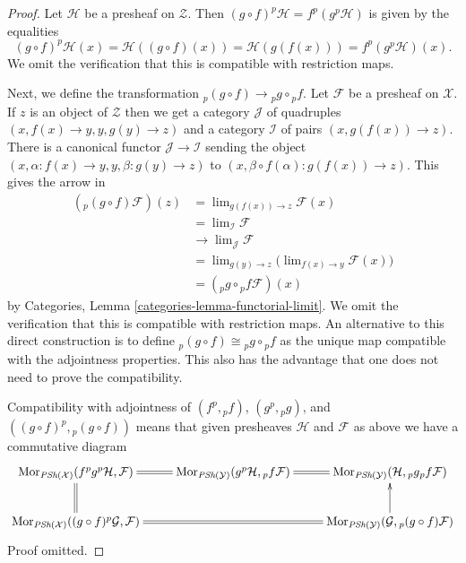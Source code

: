 \documentclass[10pt,a4paper]{amsart}
\theoremstyle{plain}
\theoremstyle{definition}
\theoremstyle{remark}
\numberwithin{equation}{subsection}
\def\lim{\mathop{\mathrm{lim}}\nolimits}
\def\Mor{\mathop{\mathrm{Mor}}\nolimits}
\begin{document}
\begin{proof}
Let $\mathcal{H}$ be a presheaf on $\mathcal{Z}$. Then
$(g \circ f)^p\mathcal{H} = f^p (g^p\mathcal{H})$ is given
by the equalities
$$
(g \circ f)^p\mathcal{H}(x) = \mathcal{H}((g \circ f)(x))
= \mathcal{H}(g(f(x))) = f^p (g^p\mathcal{H})(x).
$$
We omit the verification that this is compatible with restriction maps.

\medskip\noindent
Next, we define the transformation ${}_p(g \circ f) \to {}_pg \circ {}_pf$.
Let $\mathcal{F}$ be a presheaf on $\mathcal{X}$.
If $z$ is an object of $\mathcal{Z}$ then we get a
category $\mathcal{J}$ of quadruples
$(x, f(x) \to y, y, g(y) \to z)$ and a category $\mathcal{I}$
of pairs $(x, g(f(x)) \to z)$. There is a canonical functor
$\mathcal{J} \to \mathcal{I}$ sending the object
$(x, \alpha : f(x) \to y, y, \beta : g(y) \to z)$ to
$(x, \beta \circ f(\alpha) : g(f(x)) \to z)$. This gives the arrow in
\begin{align*}
({}_p(g \circ f)\mathcal{F})(z) & =
\lim_{g(f(x)) \to z} \mathcal{F}(x) \\
& = \lim_\mathcal{I} \mathcal{F} \\
& \to \lim_\mathcal{J} \mathcal{F} \\
& = \lim_{g(y) \to z}
\Big(\lim_{f(x) \to y} \mathcal{F}(x)\Big) \\
& =
({}_pg \circ {}_pf\mathcal{F})(x)
\end{align*}
by
Categories, Lemma \ref{categories-lemma-functorial-limit}.
We omit the verification that this is compatible with restriction maps.
An alternative to this direct construction is to define
${}_p(g \circ f) \cong {}_pg \circ {}_pf$
as the unique map compatible with the adjointness properties. This also
has the advantage that one does not need to prove the compatibility.

\medskip\noindent
Compatibility with adjointness of $(f^p, {}_pf)$, $(g^p, {}_pg)$, and
$((g \circ f)^p, {}_p(g \circ f))$ means that given presheaves
$\mathcal{H}$ and $\mathcal{F}$ as above we have a commutative diagram
$$
\xymatrix{
\Mor_{\textit{PSh}(\mathcal{X})}(f^pg^p\mathcal{H}, \mathcal{F})
\ar@{=}[r] \ar@{=}[d] &
\Mor_{\textit{PSh}(\mathcal{Y})}(g^p\mathcal{H}, {}_pf\mathcal{F})
\ar@{=}[r] &
\Mor_{\textit{PSh}(\mathcal{Y})}(\mathcal{H}, {}_pg{}_pf\mathcal{F})
\\
\Mor_{\textit{PSh}(\mathcal{X})}((g \circ f)^p\mathcal{G}, \mathcal{F})
\ar@{=}[rr] & &
\Mor_{\textit{PSh}(\mathcal{Y})}(\mathcal{G}, {}_p(g \circ f)\mathcal{F})
\ar[u]
}
$$
Proof omitted.
\end{proof}
\end{document}
